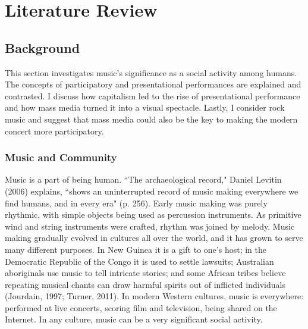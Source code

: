 \chapter{Literature Review}


\section{Background}

This section investigates music's significance as a social activity among humans. The concepts of participatory and presentational performances are explained and contrasted. I discuss how capitalism led to the rise of presentational performance and how mass media turned it into a visual spectacle. Lastly, I consider rock music and suggest that mass media could also be the key to making the modern concert more participatory.

\subsection{Music and Community}

Music is a part of being human. ``The archaeological record," Daniel Levitin (2006) explains, ``shows an uninterrupted record of music making everywhere we find humans, and in every era" (p. 256). Early music making was purely rhythmic, with simple objects being used as percussion instruments. As primitive wind and string instruments were crafted, rhythm was joined by melody. Music making gradually evolved in cultures all over the world, and it has grown to serve many different purposes. In New Guinea it is a gift to one's host; in the Democratic Republic of the Congo it is used to settle lawsuits; Australian aboriginals use music to tell intricate stories; and some African tribes believe repeating musical chants can draw harmful spirits out of inflicted individuals (Jourdain, 1997; Turner, 2011). In modern Western cultures, music is everywhere: performed at live concerts, scoring film and television, being shared on the Internet. In any culture, music can be a very significant social activity.

